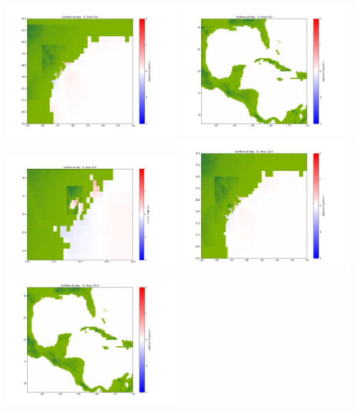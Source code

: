 \documentclass[11pt]{article}
\begin{document}
\includegraphics[width=0.475\textwidth]{frame0028fig1002.png}
\vskip 10pt 
\includegraphics[width=0.475\textwidth]{frame0028fig1003.png}
\vskip 10pt 
\includegraphics[width=0.475\textwidth]{frame0029fig1001.png}
\includegraphics[width=0.475\textwidth]{frame0029fig1002.png}
\vskip 10pt 
\includegraphics[width=0.475\textwidth]{frame0029fig1003.png}
\end{document}
